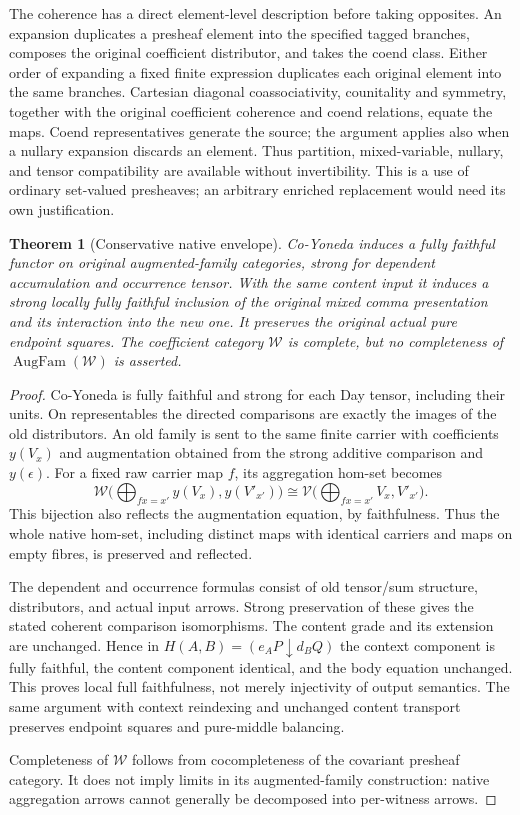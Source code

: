 \documentclass[11pt]{article}
\newtheorem{theorem}{Theorem}
\newcommand{\V}{\mathcal V}
\newcommand{\W}{\mathcal W}
\newcommand{\Aug}{\operatorname{AugFam}}
\begin{document}
The coherence has a direct element-level description before taking opposites. An expansion duplicates a presheaf element into the specified tagged branches, composes the original coefficient distributor, and takes the coend class. Either order of expanding a fixed finite expression duplicates each original element into the same branches. Cartesian diagonal coassociativity, counitality and symmetry, together with the original coefficient coherence and coend relations, equate the maps. Coend representatives generate the source; the argument applies also when a nullary expansion discards an element. Thus partition, mixed-variable, nullary, and tensor compatibility are available without invertibility. This is a use of ordinary set-valued presheaves; an arbitrary enriched replacement would need its own justification.

\begin{theorem}[Conservative native envelope]
Co-Yoneda induces a fully faithful functor on original augmented-family categories, strong for dependent accumulation and occurrence tensor. With the same content input it induces a strong locally fully faithful inclusion of the original mixed comma presentation and its interaction into the new one. It preserves the original actual pure endpoint squares. The coefficient category $\W$ is complete, but no completeness of $\Aug(\W)$ is asserted.
\end{theorem}
\begin{proof}
Co-Yoneda is fully faithful and strong for each Day tensor, including their units. On representables the directed comparisons are exactly the images of the old distributors. An old family is sent to the same finite carrier with coefficients $y(V_x)$ and augmentation obtained from the strong additive comparison and $y(\epsilon)$. For a fixed raw carrier map $f$, its aggregation hom-set becomes
\[
 \W\bigl(\bigoplus_{fx=x'}y(V_x),y(V'_{x'})\bigr)
 \cong\V\bigl(\bigoplus_{fx=x'}V_x,V'_{x'}\bigr).
\]
This bijection also reflects the augmentation equation, by faithfulness. Thus the whole native hom-set, including distinct maps with identical carriers and maps on empty fibres, is preserved and reflected.

The dependent and occurrence formulas consist of old tensor/sum structure, distributors, and actual input arrows. Strong preservation of these gives the stated coherent comparison isomorphisms. The content grade and its extension are unchanged. Hence in $H(A,B)=(e_AP\downarrow d_BQ)$ the context component is fully faithful, the content component identical, and the body equation unchanged. This proves local full faithfulness, not merely injectivity of output semantics. The same argument with context reindexing and unchanged content transport preserves endpoint squares and pure-middle balancing.

Completeness of $\W$ follows from cocompleteness of the covariant presheaf category. It does not imply limits in its augmented-family construction: native aggregation arrows cannot generally be decomposed into per-witness arrows.
\end{proof}
\end{document}

